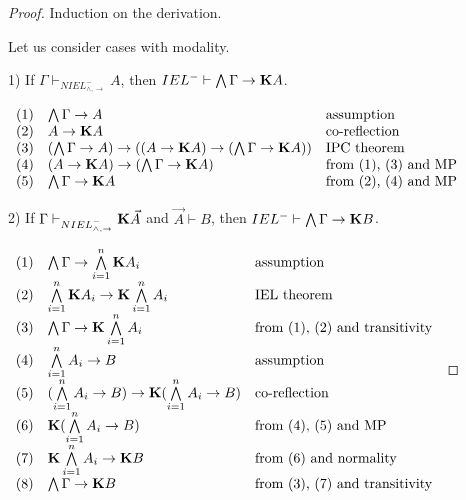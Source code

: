 \documentclass[a4paper]{article}
\begin{document}
  \begin{proof}
Induction on the derivation.

  \vspace{\baselineskip}

Let us consider cases with modality.

\vspace{\baselineskip}

1) If $\Gamma \vdash_{NIEL^{-}_{\land, \to}} A$, then $IEL^{-} \vdash \bigwedge \Gamma \rightarrow {\bf K}A$.

$\begin{array}{lll}
(1) & \bigwedge \Gamma \rightarrow A & \text{assumption}\\
(2) & A \rightarrow {\bf K}A &\text{co-reflection}\\
(3) & (\bigwedge \Gamma \rightarrow A) \rightarrow ((A \rightarrow {\bf K}A) \rightarrow (\bigwedge \Gamma \rightarrow {\bf K}A))&\text{IPC theorem}\\
(4) & (A \rightarrow {\bf K}A) \rightarrow (\bigwedge \Gamma \rightarrow {\bf K}A) &\text{from (1), (3) and MP}\\
(5) & \bigwedge \Gamma \rightarrow {\bf K}A &\text{from (2), (4) and MP}\\
\end{array}$

\vspace{\baselineskip}

2) If $\Gamma \vdash_{NIEL^{-}_{\land, \to}} {\bf K} \vec{A}$ and $\vec{A} \vdash B$, then $IEL^{-} \vdash \bigwedge \Gamma \rightarrow {\bf K}B$.

$\begin{array}{lll}
(1) &\bigwedge \Gamma \rightarrow \bigwedge \limits_{i = 1}^{n} {\bf K} A_i & \text{assumption} \\
(2) &\bigwedge \limits_{i = 1}^{n} {\bf K} A_i \rightarrow {\bf K} \bigwedge \limits_{i = 1}^{n} A_i& \text{IEL theorem} \\
(3) &\bigwedge \Gamma \rightarrow {\bf K} \bigwedge \limits_{i = 1}^{n} A_i & \text{from (1), (2) and transitivity} \\
(4) &\bigwedge \limits_{i = 1}^{n} A_i \rightarrow B& \text{assumption} \\
(5) &(\bigwedge \limits_{i = 1}^{n} A_i \rightarrow B) \rightarrow {\bf K} (\bigwedge \limits_{i = 1}^{n} A_i \rightarrow B)& \text{co-reflection}\\
(6) &{\bf K} (\bigwedge \limits_{i = 1}^{n} A_i \rightarrow B)& \text{from (4), (5) and MP} \\
(7) &{\bf K} \bigwedge \limits_{i = 1}^{n} A_i \rightarrow {\bf K} B & \text{from (6) and normality} \\
(8) &\bigwedge \Gamma \rightarrow {\bf K} B & \text{from (3), (7) and transitivity}
\end{array}$

  \end{proof}
\end{document}

